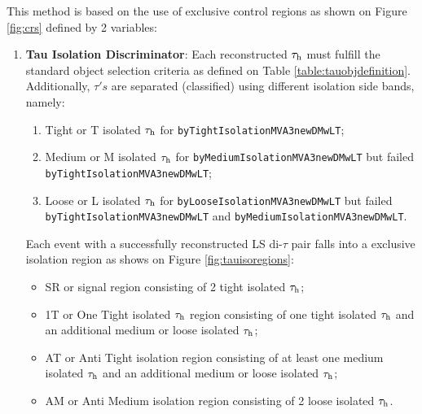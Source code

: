 This method is based on the use of exclusive control regions as shown on Figure \ref{fig:crs} defined by 2 variables:

\begin{enumerate}
	\item \textbf{Tau Isolation Discriminator}: Each reconstructed $\tau_{\text{h}}$ must fulfill the standard object selection criteria as defined on Table \ref{table:tauobjdefinition}. Additionally, $\tau's$ are separated (classified) using different isolation side bands, namely:
	
	\begin{enumerate}
		\item Tight or T isolated $\tau_{\text{h}}$ for \texttt{byTight\-IsolationMVA3newDMwLT};
		\item Medium or M isolated $\tau_{\text{h}}$ for \texttt{byMedium\-IsolationMVA3newDMwLT} but failed \texttt{byTight\-IsolationMVA3newDMwLT};
		\item Loose or L isolated $\tau_{\text{h}}$  for \texttt{byLoose\-IsolationMVA3newDMwLT} but failed \texttt{byTight\-IsolationMVA3newDMwLT} and \texttt{byMedium\-IsolationMVA3newDMwLT}.
	\end{enumerate}
	
	Each event with a successfully reconstructed LS di-$\tau$ pair falls into a exclusive isolation region as shows on Figure \ref{fig:tauisoregions}:
	
	\begin{itemize}
		\item SR or signal region consisting of 2 tight isolated $\tau_{\text{h}}$;
		\item 1T or One Tight isolated $\tau_{\text{h}}$ region consisting of one tight isolated $\tau_{\text{h}}$ and an additional medium or loose isolated $\tau_{\text{h}}$;
		\item AT or Anti Tight isolation region consisting of at least one medium isolated $\tau_{\text{h}}$ and an additional medium or loose isolated $\tau_{\text{h}}$;
		\item AM or Anti Medium isolation region consisting of 2 loose isolated $\tau_{\text{h}}$.
	\end{itemize}
	

\end{enumerate}
